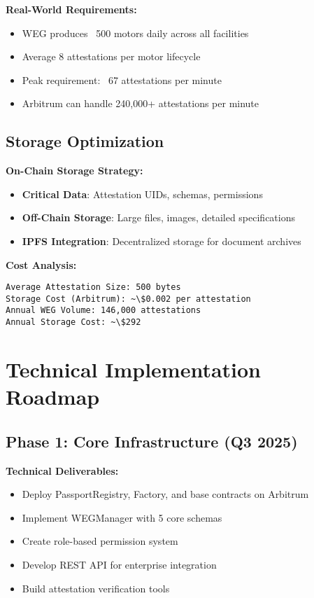 \documentclass[11pt,a4paper]{article}
\begin{document}
\textbf{Real-World Requirements:}
\begin{itemize}[leftmargin=0.5cm]
    \item WEG produces ~500 motors daily across all facilities
    \item Average 8 attestations per motor lifecycle
    \item Peak requirement: ~67 attestations per minute
    \item Arbitrum can handle 240,000+ attestations per minute
\end{itemize}

\subsection{Storage Optimization}

\textbf{On-Chain Storage Strategy:}
\begin{itemize}[leftmargin=0.5cm]
    \item \textbf{Critical Data}: Attestation UIDs, schemas, permissions
    \item \textbf{Off-Chain Storage}: Large files, images, detailed specifications
    \item \textbf{IPFS Integration}: Decentralized storage for document archives
\end{itemize}

\textbf{Cost Analysis:}
\begin{verbatim}
Average Attestation Size: 500 bytes
Storage Cost (Arbitrum): ~\$0.002 per attestation
Annual WEG Volume: 146,000 attestations
Annual Storage Cost: ~\$292
\end{verbatim}

\section{Technical Implementation Roadmap}

\subsection{Phase 1: Core Infrastructure (Q3 2025)}

\textbf{Technical Deliverables:}
\begin{itemize}[leftmargin=0.5cm]
    \item Deploy PassportRegistry, Factory, and base contracts on Arbitrum
    \item Implement WEGManager with 5 core schemas
    \item Create role-based permission system
    \item Develop REST API for enterprise integration
    \item Build attestation verification tools
\end{itemize}
\end{document}
